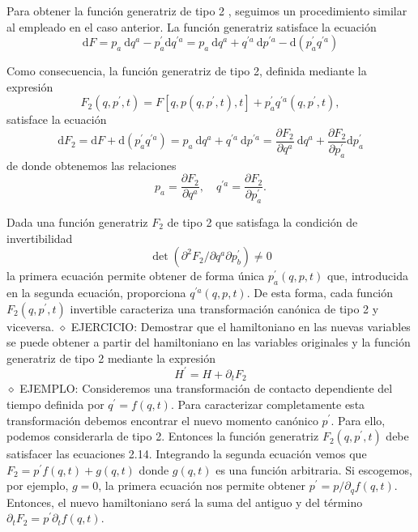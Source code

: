 Para obtener la función generatriz de tipo 2 , seguimos un procedimiento similar al empleado en el caso anterior. La función generatriz satisface la ecuación
$$
\mathrm{d} F=p_{a} \mathrm{~d} q^{a}-p_{a}^{\prime} \mathrm{d} q^{\prime a}=p_{a} \mathrm{~d} q^{a}+q^{\prime a} \mathrm{~d} p^{\prime a}-\mathrm{d}\left(p_{a}^{\prime} q^{\prime a}\right)
$$

Como consecuencia, la función generatriz de tipo 2, definida mediante la expresión
$$
F_{2}\left(q, p^{\prime}, t\right)=F\left[q, p\left(q, p^{\prime}, t\right), t\right]+p_{a}^{\prime} q^{\prime a}\left(q, p^{\prime}, t\right),
$$
satisface la ecuación
$$
\mathrm{d} F_{2}=\mathrm{d} F+\mathrm{d}\left(p_{a}^{\prime} q^{\prime a}\right)=p_{a} \mathrm{~d} q^{a}+q^{\prime a} \mathrm{~d} p^{\prime a}=\frac{\partial F_{2}}{\partial q^{a}} \mathrm{~d} q^{a}+\frac{\partial F_{2}}{\partial p_{a}^{\prime}} \mathrm{d} p_{a}^{\prime}
$$
de donde obtenemos las relaciones
$$
\begin{equation*}
p_{a}=\frac{\partial F_{2}}{\partial q^{a}}, \quad q^{\prime a}=\frac{\partial F_{2}}{\partial p_{a}^{\prime}} . \tag{2.14}
\end{equation*}
$$

Dada una función generatriz $F_{2}$ de tipo 2 que satisfaga la condición de invertibilidad
$$
\operatorname{det}\left(\partial^{2} F_{2} / \partial q^{a} \partial p_{b}^{\prime}\right) \neq 0
$$
la primera ecuación permite obtener de forma única $p_{a}^{\prime}(q, p, t)$ que, introducida en la segunda ecuación, proporciona $q^{\prime a}(q, p, t)$. De esta forma, cada función $F_{2}\left(q, p^{\prime}, t\right)$ invertible caracteriza una transformación canónica de tipo 2 y viceversa.
$\diamond$ EJERCICIO: Demostrar que el hamiltoniano en las nuevas variables se puede obtener a partir del hamiltoniano en las variables originales y la función generatriz de tipo 2 mediante la expresión
$$
H^{\prime}=H+\partial_{t} F_{2}
$$
$\diamond$ EJEMPLO: Consideremos una transformación de contacto dependiente del tiempo definida por $q^{\prime}=f(q, t)$. Para caracterizar completamente esta transformación debemos encontrar el nuevo momento canónico $p^{\prime}$. Para ello, podemos considerarla de tipo 2. Entonces la función generatriz $F_{2}\left(q, p^{\prime}, t\right)$ debe satisfacer las ecuaciones 2.14. Integrando la segunda ecuación vemos que $F_{2}=p^{\prime} f(q, t)+g(q, t)$ donde $g(q, t)$ es una función arbitraria. Si escogemos, por ejemplo, $g=0$, la primera ecuación nos permite obtener $p^{\prime}=p / \partial_{q} f(q, t)$.
Entonces, el nuevo hamiltoniano será la suma del antiguo y del término $\partial_{t} F_{2}=p^{\prime} \partial_{t} f(q, t)$.
